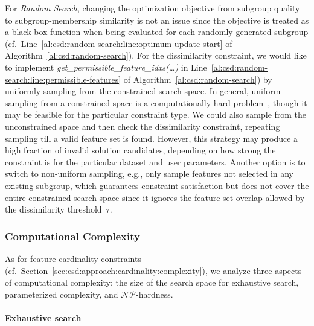 \documentclass{article}
\theoremstyle{definition}
\begin{document}
For \emph{Random Search}, changing the optimization objective from subgroup quality to subgroup-membership similarity is not an issue since the objective is treated as a black-box function when being evaluated for each randomly generated subgroup (cf.~Line~\ref{al:csd:random-search:line:optimum-update-start} of Algorithm~\ref{al:csd:random-search}).
For the dissimilarity constraint, we would like to implement \emph{get\_permissible\_feature\_idxs(\dots)} in Line~\ref{al:csd:random-search:line:permissible-features} of Algorithm~\ref{al:csd:random-search}) by uniformly sampling from the constrained search space.
In general, uniform sampling from a constrained space is a computationally hard problem~\cite{ermon2012uniform}, though it may be feasible for the particular constraint type.
We could also sample from the unconstrained space and then check the dissimilarity constraint, repeating sampling till a valid feature set is found.
However, this strategy may produce a high fraction of invalid solution candidates, depending on how strong the constraint is for the particular dataset and user parameters.
Another option is to switch to non-uniform sampling, e.g., only sample features not selected in any existing subgroup, which guarantees constraint satisfaction but does not cover the entire constrained search space since it ignores the feature-set overlap allowed by the dissimilarity threshold~$\tau$.

\subsubsection{Computational Complexity}
\label{sec:csd:approach:alternatives:complexity}

As for feature-cardinality constraints (cf.~Section~\ref{sec:csd:approach:cardinality:complexity}), we analyze three aspects of computational complexity:
the size of the search space for exhaustive search, parameterized complexity, and $\mathcal{NP}$-hardness.

\paragraph{Exhaustive search}
\end{document}
